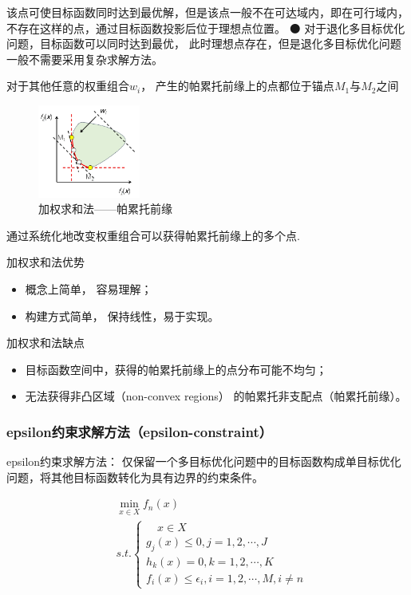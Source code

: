 \begin{example}
    该点可使目标函数同时达到最优解，但是该点一般不在可达域内，即在可行域内，不存在这样的点，通过目标函数投影后位于理想点位置。
    ⚫
    对于退化多目标优化问题，目标函数可以同时达到最优， 此时理想点存在，但是退化多目标优化问题一般不需要采用复杂求解方法。

    对于其他任意的权重组合$w_i$， 产生的帕累托前缘上的点都位于锚点$M_1$与$M_2$之间
    \begin{figure}[ht]
        \centering
        \includegraphics[width=0.3\textwidth]{pic/2.7.8.png}
        \caption{加权求和法——帕累托前缘}
    \end{figure}

    通过系统化地改变权重组合可以获得帕累托前缘上的多个点.
\end{example}

加权求和法优势
\begin{itemize}[itemsep=0pt,parsep=0pt]
    \item 概念上简单， 容易理解；
    \item 构建方式简单， 保持线性，易于实现。
\end{itemize}

加权求和法缺点
\begin{itemize}[itemsep=0pt,parsep=0pt]
    \item 目标函数空间中，获得的帕累托前缘上的点分布可能不均匀；
    \item 无法获得非凸区域（non-convex regions） 的帕累托非支配点（帕累托前缘）。
\end{itemize}

\subsubsection{epsilon约束求解方法（epsilon-constraint）}

epsilon约束求解方法： 仅保留一个多目标优化问题中的目标函数构成单目标优化问题，将其他目标函数转化为具有边界的约束条件。

\begin{equation}
    \begin{aligned}
         & \min_{x \in X} f_n(x)                                    \\
         & s.t.   \begin{cases}
                      \quad x \in X                   \\
                      g_j(x) \leq 0, j = 1,2,\cdots,J \\
                      h_k(x) = 0, k = 1,2,\cdots,K    \\
                      f_i(x) \leq \epsilon_i, i = 1,2,\cdots,M, i \neq n
                  \end{cases}
    \end{aligned}
\end{equation}

